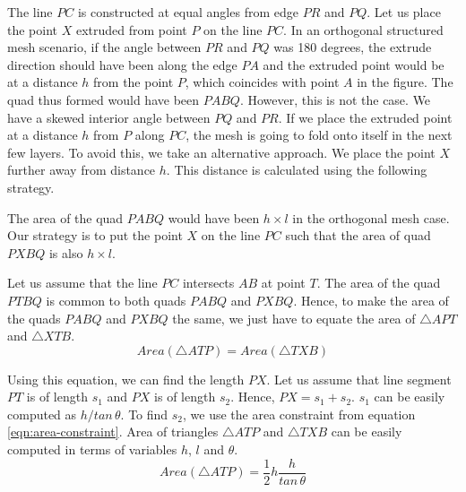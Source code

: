 \documentclass[conf]{new-aiaa}
\begin{document}
The line $PC$ is constructed at equal angles from edge $PR$ and $PQ$. Let us place the point $X$ extruded from point $P$ on the line $PC$. In an orthogonal structured mesh scenario, if the angle between $PR$ and $PQ$ was 180 degrees, the extrude direction should have been along the edge $PA$ and the extruded point would be at a distance $h$ from the point $P$, which coincides with point $A$ in the figure. The quad thus formed would have been $PABQ$. However, this is not the case. We have a skewed interior angle between $PQ$ and $PR$. If we place the extruded point at a distance $h$ from $P$ along $PC$, the mesh is going to fold onto itself in the next few layers. To avoid this, we take an alternative approach. We place the point $X$ further away from distance $h$. This distance is calculated using the following strategy.

The area of the quad $PABQ$ would have been $h\times l$ in the orthogonal mesh case. Our strategy is to put the point $X$ on the line $PC$ such that the area of quad $PXBQ$ is also $h\times l$.

Let us assume that the line $PC$ intersects $AB$ at point $T$. The area of the quad $PTBQ$ is common to both quads $PABQ$ and $PXBQ$. Hence, to make the area of the quads $PABQ$ and $PXBQ$ the same, we just have to equate the area of $\bigtriangleup APT$ and $\bigtriangleup XTB$.
\begin{equation}
    Area(\bigtriangleup ATP) = Area(\bigtriangleup TXB)
    \label{eqn:area-constraint}
\end{equation}

Using this equation, we can find the length $PX$. Let us assume that line segment $PT$ is of length $s_1$ and $PX$ is of length $s_2$. Hence, $PX = s_1 + s_2$. $s_1$ can be easily computed as $h/tan \, \theta$. To find $s_2$, we use the area constraint from equation \ref{eqn:area-constraint}. Area of triangles $\bigtriangleup ATP$ and $\bigtriangleup TXB$ can be easily computed in terms of variables $h$, $l$ and $\theta$.
\begin{equation}
    Area(\bigtriangleup ATP) = \dfrac{1}{2} h \dfrac{h}{tan \, \theta}
    \label{eqn-area1}
\end{equation}
\end{document}
